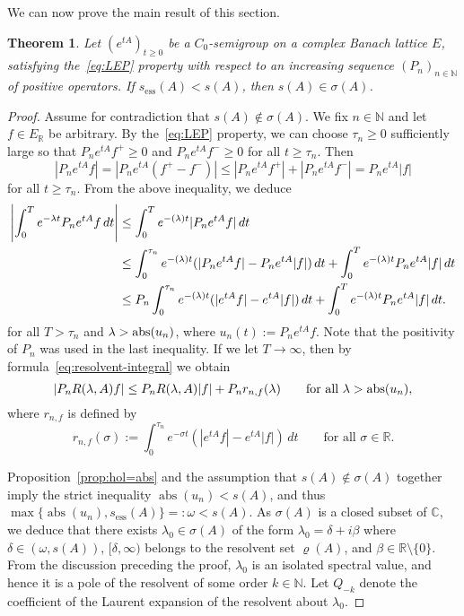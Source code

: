 \documentclass[a4paper, reqno]{amsart}
\numberwithin{equation}{section}
\theoremstyle{plain}
\newtheorem{theorem}{Theorem}[section]
\theoremstyle{definition}
\theoremstyle{remark}
\DeclareMathOperator{\abs}{abs}
\let\Re\relax
\DeclareMathOperator{\Re}{Re}
\newcommand{\NN}{\mathbb{N}}
\newcommand{\RR}{\mathbb{R}}
\newcommand{\CC}{\mathbb{C}}
\begin{document}
We can now prove the main result of this section.
\begin{theorem}
	\label{thm:spectral-bound}
	Let $(e^{tA})_{t\ge 0}$ be a $C_0$-semigroup on a complex Banach lattice $E$, satisfying the~\eqref{eq:LEP} property with respect to an increasing sequence $(P_n)_{n\in\NN}$ of positive operators. If $s_{\mathrm{ess}}(A)<s(A)$, then $s(A)\in\sigma(A)$.
\end{theorem}
\begin{proof}
	Assume for contradiction that $s(A)\not\in\sigma(A)$. We fix $n\in\NN$ and let $f\in E_\RR$ be arbitrary. By the~\eqref{eq:LEP} property, we can choose $\tau_n\ge 0$ sufficiently large so that $P_n e^{tA}f^+\ge 0$ and $P_n e^{tA}f^-\ge 0$ for all $t\ge\tau_n$. Then
	\begin{equation*}
		|P_n e^{tA}f|=|P_n e^{tA}(f^+ - f^-)|\le |P_n e^{tA}f^+|+|P_n e^{tA}f^-| = P_n e^{tA}|f|
	\end{equation*}
	for all $t\ge\tau_n$. From the above inequality, we deduce
	\begin{align*}
		\left|\int_0^T e^{-\lambda t}P_n e^{tA}f\,dt\right| &\le \int_0^T e^{-(\Re\lambda)t}|P_n e^{tA}f|\,dt \\
		&\le \int_0^{\tau_n} e^{-(\Re\lambda)t}(|P_n e^{tA}f|-P_n e^{tA}|f|)\,dt + \int_0^T e^{-(\Re\lambda)t}P_n e^{tA}|f|\,dt \\
		&\le P_n \int_0^{\tau_n} e^{-(\Re\lambda)t}(|e^{tA}f|-e^{tA}|f|)\,dt + \int_0^T e^{-(\Re\lambda)t}P_n e^{tA}|f|\,dt.
	\end{align*}
	for all $T>\tau_n$ and $\Re\lambda >\abs(u_n)$, where $u_n(t):=P_n e^{tA}f$. Note that the positivity of $P_n$ was used in the last inequality. If we let $T\to\infty$, then by formula~\eqref{eq:resolvent-integral} we obtain
	\begin{equation}
		\label{eq:Pn-resolvent-est}
		|P_n R(\lambda,A)f| \le P_n R(\Re\lambda,A)|f| + P_n r_{n,f}(\Re\lambda) \qquad\text{for all }\Re\lambda >\abs(u_n),
	\end{equation}
	where $r_{n,f}$ is defined by
	\begin{equation}
		\label{eq:rnf}
		r_{n,f}(\sigma):=\int_0^{\tau_n} e^{-\sigma t}(|e^{tA}f|-e^{tA}|f|)\,dt \qquad\text{for all }\sigma\in\RR.
	\end{equation}

	Proposition~\ref{prop:hol=abs} and the assumption that $s(A)\not\in\sigma(A)$ together imply the strict inequality $\abs(u_n)<s(A)$, and thus $\max\{\abs(u_n), s_{\mathrm{ess}}(A)\}=:\omega<s(A)$. As $\sigma(A)$ is a closed subset of $\CC$, we deduce that there exists $\lambda_0\in\sigma(A)$ of the form $\lambda_0=\delta+i\beta$ where $\delta\in (\omega, s(A))$, $[\delta,\infty)$ belongs to the resolvent set $\varrho(A)$, and $\beta\in\RR\setminus\{0\}$. From the discussion preceding the proof, $\lambda_0$ is an isolated spectral value, and hence it is a pole of the resolvent of some order $k\in\NN$. Let $Q_{-k}$ denote the coefficient of the Laurent expansion of the resolvent about $\lambda_0$.
	

\end{proof}
\end{document}
